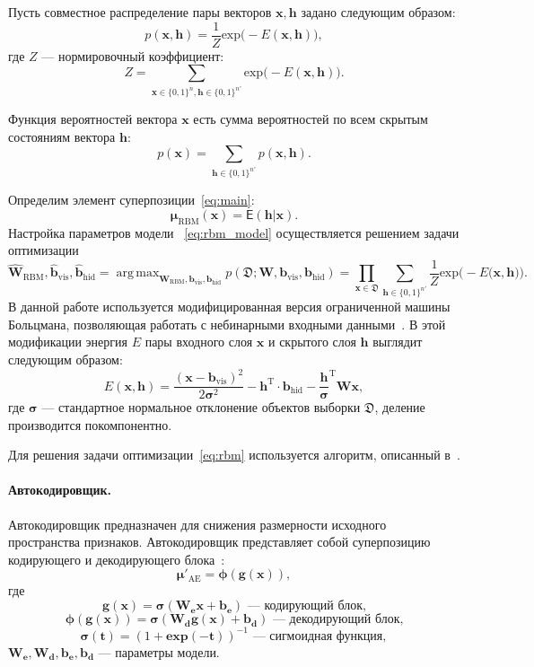\documentclass[12pt,notitlepage]{article}
\DeclareMathOperator*{\argmax}{arg\,max}
\begin{document}
Пусть совместное распределение пары векторов $\mathbf{x}, \mathbf{h}$ задано следующим образом:
\[
	p(\mathbf{x}, \mathbf{h}) = \frac{1}{Z} \text{exp}\bigl(-E(\mathbf{x},\mathbf{h})\bigr),
\]
где $Z$ --- нормировочный коэффициент:
\[
 Z = \sum_{\mathbf{x} \in \{0,1\}^n, \mathbf{h}\in \{0,1\}^{n'}} \text{exp}\bigl(-E(\mathbf{x},\mathbf{h})\bigr).
\]


Функция вероятностей вектора $\mathbf{x}$ есть сумма вероятностей по всем скрытым состояниям вектора $\mathbf{h}$:
\[
	p(\mathbf{x}) = \sum_{\mathbf{h}\in \{0,1\}^{n'}} p(\mathbf{x}, \mathbf{h}).
\]

Определим элемент суперпозиции~\eqref{eq:main}: \begin{equation}
\label{eq:rbm_model}
\boldsymbol{\mu}_\text{RBM}(\mathbf{x}) = \mathsf{E}(\mathbf{h}|\mathbf{x}).
\end{equation}
Настройка параметров модели ~\eqref{eq:rbm_model} осуществляется решением задачи оптимизации
\begin{equation}
\label{eq:rbm}
\hat{\mathbf{W}}_\text{RBM},\hat{\mathbf{b}}_\text{vis}, \hat{\mathbf{b}}_\text{hid} = \argmax_{{\mathbf{W}_\text{RBM}},{\mathbf{b}}_\text{vis}, {\mathbf{b}}_\text{hid} } p(\mathfrak{D}; {\mathbf{W}},{\mathbf{b}_\text{vis}},{\mathbf{b}_\text{hid}}) = \prod_{\mathbf{x} \in \mathfrak{D}} \sum_{\mathbf{h}\in \{0,1\}^{n'}} \frac{1}{Z} \text{exp}\bigl(-E(\mathbf{\mathbf{x}},\mathbf{h)}\bigr).
\end{equation}
В данной работе используется модифицированная версия ограниченной машины Больцмана, позволяющая работать с небинарными входными данными~\cite{gbrbm}. В этой модификации энергия $E$ пары входного слоя $\mathbf{x}$ и скрытого слоя $\mathbf{h}$ выглядит следующим образом: 
\[
E(\mathbf{x},\mathbf{h}) = \frac{(\mathbf{x} - \mathbf{b}_\text{vis})^2}{2\boldsymbol{\sigma}^2} -\mathbf{h}^\text{T} \cdot \mathbf{b}_\text{hid} - \frac{\mathbf{h}}{\boldsymbol{\sigma}}^\text{T}\mathbf{W}\mathbf{x},
\]
где $\boldsymbol{\sigma}$ --- стандартное нормальное отклонение объектов выборки $\mathfrak{D}$, деление производится покомпонентно.

Для решения задачи оптимизации~\eqref{eq:rbm} используется алгоритм, описанный в~\cite{foundamentals}. 

\paragraph{Автокодировщик.}
Автокодировщик предназначен для снижения размерности исходного пространства признаков. 
Автокодировщик представляет собой суперпозицию кодирующего и декодирующего блока~\cite{foundamentals}:
\[
 \mathbf{\boldsymbol{\mu}}'_\text{AE} = \boldsymbol{\phi}(\mathbf{g}(\mathbf{x})),
\]
где $$\mathbf{g}(\mathbf{x}) = \boldsymbol{\sigma}(\mathbf{W}_\textbf{e}\mathbf{x}+\mathbf{b}_\textbf{e}) \text{ --- кодирующий блок,}$$ 
$$ \boldsymbol{\phi}(\mathbf{g}(\mathbf{x})) = \boldsymbol{\sigma}(\mathbf{W}_\textbf{d}\mathbf{g}(\mathbf{x})+\mathbf{b}_\textbf{d})\text{ --- декодирующий блок,}$$ $$\boldsymbol{\sigma}(\mathbf{t}) = (1+\textbf{exp}({-\mathbf{t}}))^{-1} \text{ --- сигмоидная функция},$$ $\mathbf{W}_\textbf{e},\mathbf{W}_\textbf{d},\mathbf{b}_\textbf{e}, \mathbf{b}_\textbf{d}$ --- параметры модели.
\end{document}
